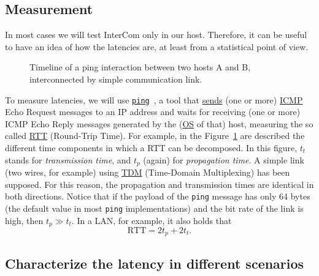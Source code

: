 \subsection{Measurement}
In most cases we will test InterCom only in our host. Therefore, it
can be useful to have an idea of how the latencies are, at
least from a statistical point of view.

\begin{figure}
  \begin{center}
  \end{center}
  \caption{Timeline of a ping interaction between two hosts A and B,
    interconnected by simple communication link.}
  \label{fig:ping_timeline}
\end{figure}

To measure latencies, we will use
\href{https://github.com/torvalds/linux/blob/master/net/ipv4/ping.c}{\texttt{ping}}~\cite{Kurose-Ross,Forouzan},
a tool that
\href{https://en.wikipedia.org/wiki/Ping_(networking_utility)}{sends}
(one or more)
\href{https://en.wikipedia.org/wiki/Internet_Control_Message_Protocol}{ICMP}
Echo Request messages to an IP address and waits for receiving (one or
more) ICMP Echo Reply messages generated by the
(\href{https://en.wikipedia.org/wiki/Operating_system}{OS} of that)
host, measuring the so called
\href{https://en.wikipedia.org/wiki/Round-trip_delay}{RTT} (Round-Trip
Time). For example, in the Figure~\ref{fig:ping_timeline} are
described the different time components in which a RTT can be
decomposed. In this figure, $t_t$ stands for \emph{transmission time},
and $t_p$ (again) for \emph{propagation time}. A simple link (two
wires, for example) using
\href{https://en.wikipedia.org/wiki/Time-division_multiple_access}{TDM}
(Time-Domain Multiplexing) has been supposed. For this reason, the
propagation and transmission times are identical in both
directions. Notice that if the payload of the \verb|ping| message has
only 64 bytes (the default value in most \verb|ping| implementations)
and the bit rate of the link is high, then $t_p\gg t_t.$ In a LAN, for
example, it also holds that
\begin{equation}
  \text{RTT} = 2t_p + 2t_t.
  \label{eq:RTT}
\end{equation}

\subsection{Characterize the latency in different scenarios}

